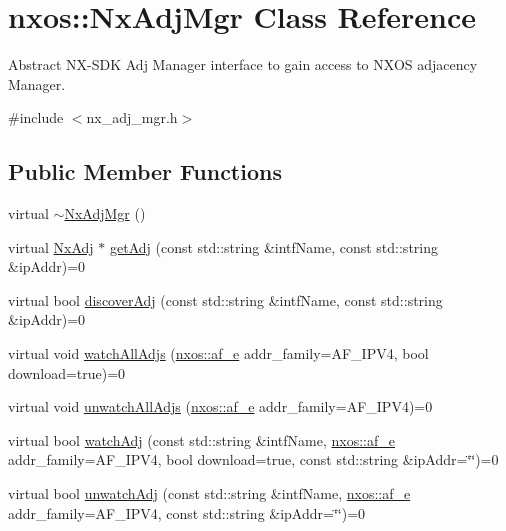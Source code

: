 \hypertarget{classnxos_1_1_nx_adj_mgr}{}\section{nxos\+:\+:Nx\+Adj\+Mgr Class Reference}
\label{classnxos_1_1_nx_adj_mgr}


Abstract N\+X-\/\+S\+DK Adj Manager interface to gain access to N\+X\+OS adjacency Manager.  




{\ttfamily \#include $<$nx\+\_\+adj\+\_\+mgr.\+h$>$}

\subsection*{Public Member Functions}
\begin{DoxyCompactItemize}
\item 
virtual \mbox{\hyperlink{classnxos_1_1_nx_adj_mgr_a771d390eda9cac623c3b8f9452721da5}{$\sim$\+Nx\+Adj\+Mgr}} ()
\item 
virtual \mbox{\hyperlink{classnxos_1_1_nx_adj}{Nx\+Adj}} $\ast$ \mbox{\hyperlink{classnxos_1_1_nx_adj_mgr_a0e3f6888c7c34531ff846c359195259e}{get\+Adj}} (const std\+::string \&intf\+Name, const std\+::string \&ip\+Addr)=0
\item 
virtual bool \mbox{\hyperlink{classnxos_1_1_nx_adj_mgr_a9c347e5836f0ec686fe6605a41fbef5e}{discover\+Adj}} (const std\+::string \&intf\+Name, const std\+::string \&ip\+Addr)=0
\item 
virtual void \mbox{\hyperlink{classnxos_1_1_nx_adj_mgr_a2d0bc4dfa5a270ff464238a59c613993}{watch\+All\+Adjs}} (\mbox{\hyperlink{nx__common_8h_a3a667f48b94db10aa398940dc5bf72d7}{nxos\+::af\+\_\+e}} addr\+\_\+family=A\+F\+\_\+\+I\+P\+V4, bool download=true)=0
\item 
virtual void \mbox{\hyperlink{classnxos_1_1_nx_adj_mgr_aa3a1b51dc9fd549e2ef1ac1928030883}{unwatch\+All\+Adjs}} (\mbox{\hyperlink{nx__common_8h_a3a667f48b94db10aa398940dc5bf72d7}{nxos\+::af\+\_\+e}} addr\+\_\+family=A\+F\+\_\+\+I\+P\+V4)=0
\item 
virtual bool \mbox{\hyperlink{classnxos_1_1_nx_adj_mgr_ae8bd120a58a32548d68a4327e9c26459}{watch\+Adj}} (const std\+::string \&intf\+Name, \mbox{\hyperlink{nx__common_8h_a3a667f48b94db10aa398940dc5bf72d7}{nxos\+::af\+\_\+e}} addr\+\_\+family=A\+F\+\_\+\+I\+P\+V4, bool download=true, const std\+::string \&ip\+Addr=\char`\"{}\char`\"{})=0
\item 
virtual bool \mbox{\hyperlink{classnxos_1_1_nx_adj_mgr_a70afce2634199180031767e150332687}{unwatch\+Adj}} (const std\+::string \&intf\+Name, \mbox{\hyperlink{nx__common_8h_a3a667f48b94db10aa398940dc5bf72d7}{nxos\+::af\+\_\+e}} addr\+\_\+family=A\+F\+\_\+\+I\+P\+V4, const std\+::string \&ip\+Addr=\char`\"{}\char`\"{})=0

\end{DoxyCompactItemize}
